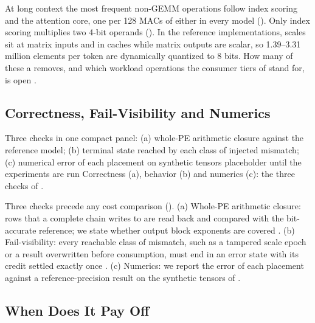 %
At long context the most frequent non-GEMM operations follow index scoring and the attention core, one per 128 MACs of either in every model ().
Only index scoring multiplies two 4-bit operands ().
In the reference implementations, scales sit at matrix inputs and in caches while matrix outputs are scalar, so 1.39--3.31 million elements per token are dynamically quantized to 8 bits.
How many of these a \blockscaled \handoff removes, and which workload operations the consumer tiers of  stand for, is open .

\subsection{Correctness, Fail-Visibility and Numerics}\label{sec:res-correct}

%
  {Three checks in one compact panel: (a) whole-PE arithmetic closure against the reference model; (b) terminal state reached by each class of injected mismatch; (c) numerical error of each placement on synthetic tensors}%
  {placeholder until the experiments are run}%
  {Correctness (a), \failvisible behavior (b) and numerics (c): the three checks of .}

%
Three checks precede any cost comparison ().
(a) Whole-PE arithmetic closure: rows that a complete chain writes to \Lii are read back and compared with the bit-accurate reference; we state whether output block exponents are covered .
(b) Fail-visibility: every reachable class of mismatch, such as a tampered scale epoch or a result overwritten before consumption, must end in an error state with its credit settled exactly once .
(c) Numerics: we report the error of each placement against a reference-precision result on the synthetic tensors of  .

\subsection{When Does It Pay Off}\label{sec:res-payoff}

